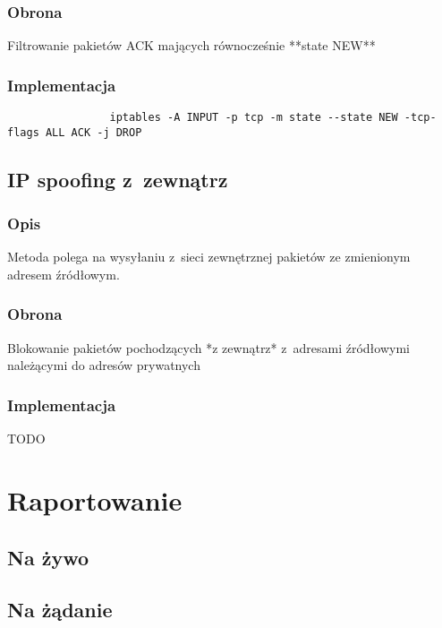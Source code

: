 \documentclass[a4paper,10pt]{article}
\begin{document}
		\subsubsection{Obrona}
			Filtrowanie pakietów ACK mających równocześnie **state NEW**
		\subsubsection{Implementacja}
			\begin{verbatim}
				iptables -A INPUT -p tcp -m state --state NEW -tcp-flags ALL ACK -j DROP
			\end{verbatim}
	\subsection{IP spoofing z~zewnątrz}
		\subsubsection{Opis}
			Metoda polega na wysyłaniu z~sieci zewnętrznej pakietów ze zmienionym adresem źródłowym.
		\subsubsection{Obrona}
			Blokowanie pakietów pochodzących *z zewnątrz* z~adresami źródłowymi należącymi do adresów prywatnych
		\subsubsection{Implementacja}
			TODO
\section{Raportowanie}
	\subsection{Na żywo}
	\subsection{Na żądanie}
\end{document}
